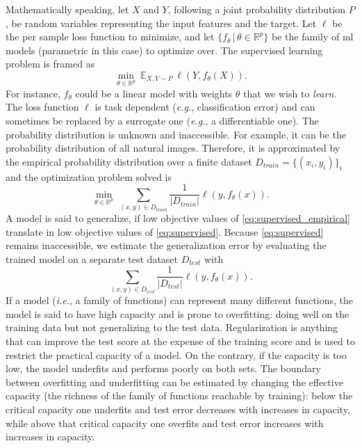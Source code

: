 \documentclass[11pt]{article}
\begin{document}
		Mathematically speaking, let $X$ and $Y$, following a joint probability distribution $P$, be random
		variables representing the input features and the target.
		Let $\ell$ be the per sample loss function to minimize, and let $\{f_\theta \, | \, \theta \in
			\mathbb{R}^p\}$ be the family of \gls{ml} models (parametric in this case) to optimize over.
		The supervised learning problem is framed as
		\begin{equation}
			\label{eq:supervised}
			\min_{\theta \in \mathbb{R}^p}\ \mathbb{E}_{X, Y \sim P}\, \ell(Y, f_\theta(X)).
		\end{equation}
		For instance,
		$f_\theta$ could be a linear model with weights $\theta$ that we wish to \emph{learn}.
		The loss function $\ell$ is task dependent (\textit{e.g.}, classification error) and can sometimes be
		replaced by a surrogate one (\textit{e.g.}, a differentiable one).
		The probability distribution is unknown and inaccessible.
		For example, it can be the probability distribution of all natural images.
		Therefore, it is approximated by the empirical probability distribution over a finite dataset
		$D_{train} = \{(x_i, y_i)\}_i$ and the optimization problem solved is
		\begin{equation}
			\label{eq:supervised_empirical}
			\min_{\theta \in \mathbb{R}^p}\ \sum_{(x, y) \in D_{train}}
			\frac{1}{|D_{train}|} \ell(y, f_\theta(x)).
		\end{equation}
		A model is said to generalize, if low
		objective values of \eqref{eq:supervised_empirical} translate in low objective values of
	    \eqref{eq:supervised}.
		Because \eqref{eq:supervised} remains inaccessible, we estimate the generalization error by
		evaluating the trained model on a separate test dataset $D_{test}$ with
		\begin{equation}
			\sum_{(x, y) \in D_{test}} \frac{1}{|D_{test}|} \ell(y, f_\theta(x)).
		\end{equation}
		If a model (\textit{i.e.}, a
		family of functions) can represent many different functions, the model is said to have high
		capacity and is prone to overfitting: doing well on the training data but not generalizing to the
		test data.
		Regularization is anything that can improve the test score at the expense of the training score and
		is used to restrict the practical capacity of a model.
		On the contrary, if the capacity is too low, the model underfits and performs poorly on both sets.
		The boundary between overfitting and underfitting can be estimated by changing the effective
		capacity (the richness of the family of functions reachable by training): below the critical
		capacity one underfits and test error decreases with increases in capacity, while above that
		critical capacity one overfits and test error increases with increases in capacity.
\end{document}
